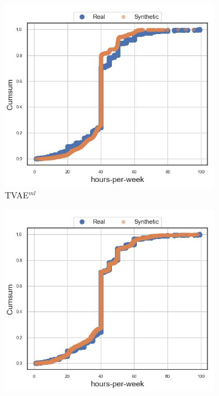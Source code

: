 
\begin{figure}[H]
	\centering
	\begin{subfigure}{0.32\textwidth}
		\centering
		\includegraphics[width=\textwidth]{images/cdf_hpw/tvae.jpg}
		\caption{TVAE$^{ml}$}
	\end{subfigure}
	\begin{subfigure}{0.32\textwidth}
		\centering
		\includegraphics[width=\textwidth]{images/cdf_hpw/ctabgan+.jpg}

\end{subfigure}
\end{figure}
